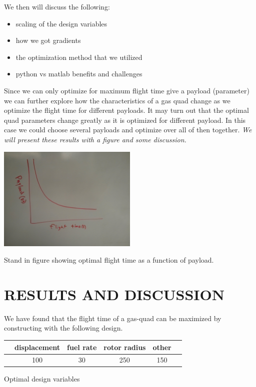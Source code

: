 \documentclass[letterpaper, 10 pt, conference]{ieeeconf}  %
\makeatletter
\newenvironment{tablehere}
  {\def\@captype{table}}
  {}
\newenvironment{figurehere}
  {\def\@captype{figure}}
  {}
\makeatother
\begin{document}
We then will discuss the following:
\begin{itemize}
	\item{scaling of the design variables}
	\item{how we got gradients}
	\item{the optimization method that we utilized}
	\item{python vs matlab benefits and challenges}
\end{itemize}

Since we can only optimize for maximum flight time give a payload (parameter) we can further explore how the characteristics of a gas quad change as we optimize the flight time for different payloads. It may turn out that the optimal quad parameters change greatly as it is optimized for different payload.  In this case we could choose several payloads and optimize over all of then together. \textit{We will present these results with a figure and some discussion.}

\begin{figurehere}
	\includegraphics[width=0.5\textwidth]{payload.jpg}
	\caption{Stand in figure showing optimal flight time as a function of payload.}
		\label{fig:payload}
\end{figurehere}


\section{RESULTS AND DISCUSSION}

We have found that the flight time of a gas-quad can be maximized by constructing with the following design.

\begin{tablehere}
\centering
\begin{tabulary}{0.5\textwidth}{|C|C|C|C|C|C|}
\hline
       & displacement & fuel rate & rotor radius & other \\ \hline
  & 100 & 30 & 250 & 150 \\ \hline
\end{tabulary}
\caption{Optimal design variables}
\label{table:fw_loop_rates}
\end{tablehere}
\end{document}
